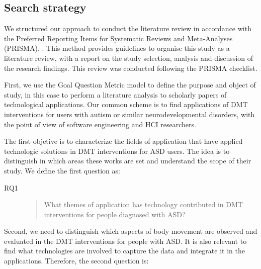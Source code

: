 \documentclass[a4paper,fleqn]{cas-sc}
\begin{document}
\subsection{Search strategy}
We structured our approach to conduct the literature review in accordance with the Preferred Reporting Items for Systematic Reviews and Meta-Analyses (PRISMA), \cite{Pagen71}. This method provides guidelines to organise this study as a literature review, with a report on the study selection, analysis and discussion of the research findings. This review was conducted following the PRISMA checklist.

First, we use the Goal Question Metric model \cite{Koziolek} to define the purpose and object of study, in this case to perform a literature analysis to scholarly papers of technological applications. Our common scheme is to find applications of DMT interventions for users with autism or similar neurodevelopmental disorders, with the point of view of software engineering and HCI researchers.



The first objetive is to characterize the fields of application that have applied technologic solutions in DMT interventions for ASD users.  The idea is to distinguish in which areas these works are set and understand the scope of their study. We define the first question as:

\begin{description}
  \item[RQ1] \begin{quote}What themes of application has technology contributed in DMT interventions for people diagnosed with ASD?\end{quote}
\end{description}


Second, we need to distinguish which aspects of body movement are observed and evaluated in the DMT interventions for people with ASD. It is also relevant to find what technologies are involved to capture the data and integrate it in the applications. Therefore, the second question is:
\end{document}

